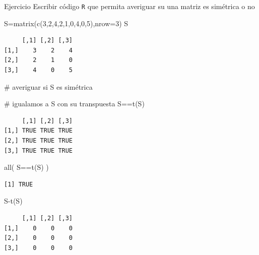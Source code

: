 \documentclass[
  ignorenonframetext,
  aspectratio=169,
  spanish,
]{beamer}
\newenvironment{Shaded}{\begin{snugshade}}{\end{snugshade}}
\newcommand{\AttributeTok}[1]{\textcolor[rgb]{0.40,0.45,0.13}{#1}}
\newcommand{\CommentTok}[1]{\textcolor[rgb]{0.37,0.37,0.37}{#1}}
\newcommand{\DecValTok}[1]{\textcolor[rgb]{0.68,0.00,0.00}{#1}}
\newcommand{\FunctionTok}[1]{\textcolor[rgb]{0.28,0.35,0.67}{#1}}
\newcommand{\NormalTok}[1]{\textcolor[rgb]{0.00,0.23,0.31}{#1}}
\newcommand{\OtherTok}[1]{\textcolor[rgb]{0.00,0.23,0.31}{#1}}
\newcommand{\SpecialCharTok}[1]{\textcolor[rgb]{0.37,0.37,0.37}{#1}}
\begin{document}
\begin{frame}[fragile]{Ejercicio}
\label{ejercicio}
Escribir código \texttt{R} que permita averiguar su una matriz es
simétrica o no

\begin{Shaded}
\begin{Highlighting}[]
\NormalTok{S}\OtherTok{=}\FunctionTok{matrix}\NormalTok{(}\FunctionTok{c}\NormalTok{(}\DecValTok{3}\NormalTok{,}\DecValTok{2}\NormalTok{,}\DecValTok{4}\NormalTok{,}\DecValTok{2}\NormalTok{,}\DecValTok{1}\NormalTok{,}\DecValTok{0}\NormalTok{,}\DecValTok{4}\NormalTok{,}\DecValTok{0}\NormalTok{,}\DecValTok{5}\NormalTok{),}\AttributeTok{nrow=}\DecValTok{3}\NormalTok{)}
\NormalTok{S}
\end{Highlighting}
\end{Shaded}

\begin{verbatim}
     [,1] [,2] [,3]
[1,]    3    2    4
[2,]    2    1    0
[3,]    4    0    5
\end{verbatim}

\begin{Shaded}
\begin{Highlighting}[]
\CommentTok{\# averiguar si S es simétrica }
\end{Highlighting}
\end{Shaded}

\begin{Shaded}
\begin{Highlighting}[]
\CommentTok{\# igualamos a S con su transpuesta }
\NormalTok{S}\SpecialCharTok{==}\FunctionTok{t}\NormalTok{(S) }
\end{Highlighting}
\end{Shaded}

\begin{verbatim}
     [,1] [,2] [,3]
[1,] TRUE TRUE TRUE
[2,] TRUE TRUE TRUE
[3,] TRUE TRUE TRUE
\end{verbatim}

\begin{Shaded}
\begin{Highlighting}[]
\FunctionTok{all}\NormalTok{( S}\SpecialCharTok{==}\FunctionTok{t}\NormalTok{(S) ) }
\end{Highlighting}
\end{Shaded}

\begin{verbatim}
[1] TRUE
\end{verbatim}

\begin{Shaded}
\begin{Highlighting}[]
\NormalTok{S}\SpecialCharTok{{-}}\FunctionTok{t}\NormalTok{(S)  }
\end{Highlighting}
\end{Shaded}

\begin{verbatim}
     [,1] [,2] [,3]
[1,]    0    0    0
[2,]    0    0    0
[3,]    0    0    0
\end{verbatim}
\end{frame}
\end{document}
